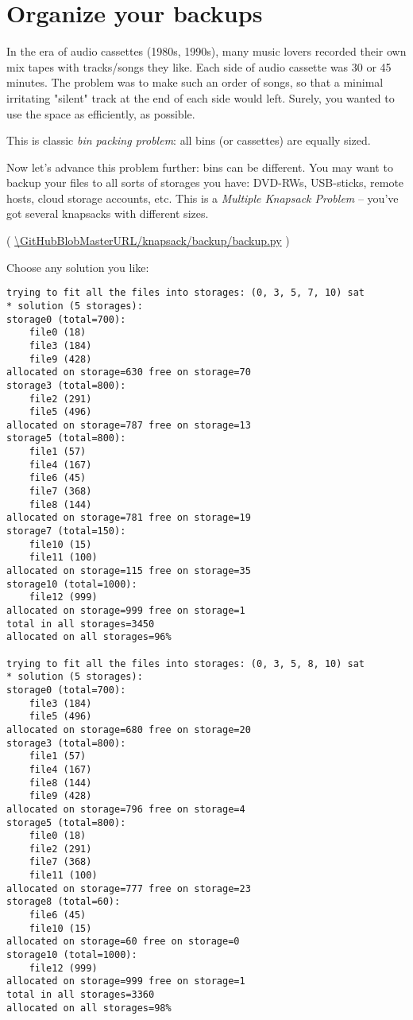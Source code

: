 \section{Organize your backups}

\renewcommand{\CURPATH}{knapsack/backup}

In the era of audio cassettes (1980s, 1990s), many music lovers recorded their own mix tapes with tracks/songs they like.
Each side of audio cassette was 30 or 45 minutes.
The problem was to make such an order of songs, so that a minimal irritating "silent" track at the end of each side would left.
Surely, you wanted to use the space as efficiently, as possible.

This is classic \emph{bin packing problem}: all bins (or cassettes) are equally sized.

Now let's advance this problem further: bins can be different.
You may want to backup your files to all sorts of storages you have: DVD-RWs, USB-sticks, remote hosts, cloud storage accounts, etc.
This is a \emph{Multiple Knapsack Problem} -- you've got several knapsacks with different sizes.



( \url{\GitHubBlobMasterURL/\CURPATH/backup.py} )

Choose any solution you like:

\begin{lstlisting}
trying to fit all the files into storages: (0, 3, 5, 7, 10) sat
* solution (5 storages):
storage0 (total=700):
    file0 (18)
    file3 (184)
    file9 (428)
allocated on storage=630 free on storage=70
storage3 (total=800):
    file2 (291)
    file5 (496)
allocated on storage=787 free on storage=13
storage5 (total=800):
    file1 (57)
    file4 (167)
    file6 (45)
    file7 (368)
    file8 (144)
allocated on storage=781 free on storage=19
storage7 (total=150):
    file10 (15)
    file11 (100)
allocated on storage=115 free on storage=35
storage10 (total=1000):
    file12 (999)
allocated on storage=999 free on storage=1
total in all storages=3450
allocated on all storages=96%

trying to fit all the files into storages: (0, 3, 5, 8, 10) sat
* solution (5 storages):
storage0 (total=700):
    file3 (184)
    file5 (496)
allocated on storage=680 free on storage=20
storage3 (total=800):
    file1 (57)
    file4 (167)
    file8 (144)
    file9 (428)
allocated on storage=796 free on storage=4
storage5 (total=800):
    file0 (18)
    file2 (291)
    file7 (368)
    file11 (100)
allocated on storage=777 free on storage=23
storage8 (total=60):
    file6 (45)
    file10 (15)
allocated on storage=60 free on storage=0
storage10 (total=1000):
    file12 (999)
allocated on storage=999 free on storage=1
total in all storages=3360
allocated on all storages=98%
\end{lstlisting}

